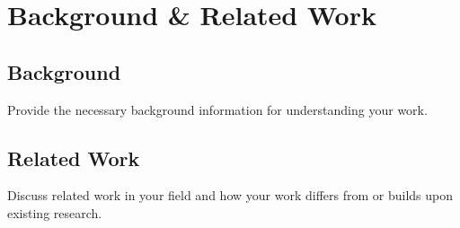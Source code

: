 \section{Background \& Related Work}
\label{sec:background}

\subsection{Background}
\label{subsec:background}

Provide the necessary background information for understanding your work.


\subsection{Related Work}
\label{subsec:related}

Discuss related work in your field and how your work differs from or builds upon existing research.

